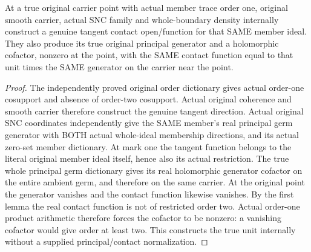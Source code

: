 \begin{theorem}
\label{hir:sharp-original-order-one-member-true-contact-unit-dictionary}
\leanok
At a true original carrier point with actual member trace order one, original
smooth carrier, actual SNC family and whole-boundary density internally
construct a genuine tangent contact open/function for that SAME member ideal.
They also produce its true original principal generator and a holomorphic
cofactor, nonzero at the point, with the SAME contact function equal to that
unit times the SAME generator on the carrier near the point.
\end{theorem}
\begin{proof}
The independently proved original order dictionary gives actual order-one
cosupport and absence of order-two cosupport. Actual original coherence and
smooth carrier therefore construct the genuine tangent direction. Actual
original SNC coordinates independently give the SAME member's real principal
germ generator with BOTH actual whole-ideal membership directions, and its
actual zero-set member dictionary. At mark one the tangent function belongs
to the literal original member ideal itself, hence also its actual restriction.
The true whole principal germ dictionary gives its real holomorphic generator
cofactor on the entire ambient germ, and therefore on the same carrier. At the original
point the generator vanishes and the contact function likewise vanishes. By
the first lemma the real contact function is not of restricted order two.
Actual order-one product arithmetic therefore forces the cofactor to be
nonzero: a vanishing cofactor would give order at least two. This constructs
the true unit internally without a supplied principal/contact normalization.
\end{proof}

